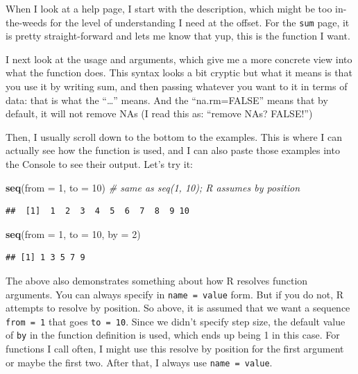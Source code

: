 \documentclass[]{book}
\newenvironment{Shaded}{\begin{snugshade}}{\end{snugshade}}
\newcommand{\CommentTok}[1]{\textcolor[rgb]{0.56,0.35,0.01}{\textit{#1}}}
\newcommand{\DataTypeTok}[1]{\textcolor[rgb]{0.13,0.29,0.53}{#1}}
\newcommand{\DecValTok}[1]{\textcolor[rgb]{0.00,0.00,0.81}{#1}}
\newcommand{\KeywordTok}[1]{\textcolor[rgb]{0.13,0.29,0.53}{\textbf{#1}}}
\newcommand{\NormalTok}[1]{#1}
\begin{document}
When I look at a help page, I start with the description, which might be too in-the-weeds for the level of understanding I need at the offset. For the \texttt{sum} page, it is pretty straight-forward and lets me know that yup, this is the function I want.

I next look at the usage and arguments, which give me a more concrete view into what the function does. This syntax looks a bit cryptic but what it means is that you use it by writing sum, and then passing whatever you want to it in terms of data: that is what the ``\ldots{}'' means. And the ``na.rm=FALSE'' means that by default, it will not remove NAs (I read this as: ``remove NAs? FALSE!'')

Then, I usually scroll down to the bottom to the examples. This is where I can actually see how the function is used, and I can also paste those examples into the Console to see their output. Let's try it:

\begin{Shaded}
\begin{Highlighting}[]
\KeywordTok{seq}\NormalTok{(}\DataTypeTok{from =} \DecValTok{1}\NormalTok{, }\DataTypeTok{to =} \DecValTok{10}\NormalTok{) }\CommentTok{# same as seq(1, 10); R assumes by position}
\end{Highlighting}
\end{Shaded}

\begin{verbatim}
##  [1]  1  2  3  4  5  6  7  8  9 10
\end{verbatim}

\begin{Shaded}
\begin{Highlighting}[]
\KeywordTok{seq}\NormalTok{(}\DataTypeTok{from =} \DecValTok{1}\NormalTok{, }\DataTypeTok{to =} \DecValTok{10}\NormalTok{, }\DataTypeTok{by =} \DecValTok{2}\NormalTok{)}
\end{Highlighting}
\end{Shaded}

\begin{verbatim}
## [1] 1 3 5 7 9
\end{verbatim}

The above also demonstrates something about how R resolves function arguments. You can always specify in \texttt{name\ =\ value} form. But if you do not, R attempts to resolve by position. So above, it is assumed that we want a sequence \texttt{from\ =\ 1} that goes \texttt{to\ =\ 10}. Since we didn't specify step size, the default value of \texttt{by} in the function definition is used, which ends up being 1 in this case. For functions I call often, I might use this resolve by position for the first
argument or maybe the first two. After that, I always use \texttt{name\ =\ value}.
\end{document}
